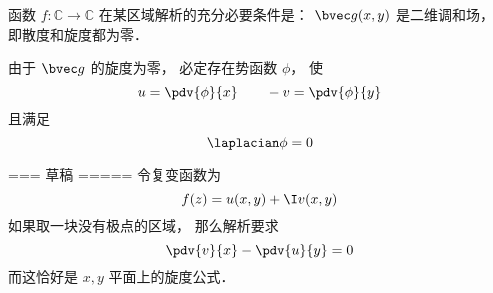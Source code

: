 \begin{theorem}{}
函数 $f:\mathbb C\to\mathbb C$ 在某区域解析的充分必要条件是： $\bvec g(x,y)$ 是二维调和场， 即散度和旋度都为零．
\end{theorem}
由于 $\bvec g$ 的旋度为零， 必定存在势函数 $\phi$， 使
\begin{equation}
u = \pdv{\phi}{x} \qquad -v = \pdv{\phi}{y}
\end{equation}
且满足
\begin{equation}
\laplacian \phi = 0
\end{equation}

=== 草稿 =====
令复变函数为
\begin{equation}
f(z) = u(x,y) + \I v(x,y)
\end{equation}
如果取一块没有极点的区域， 那么解析要求
\begin{equation}
\pdv{v}{x} - \pdv{u}{y} = 0
\end{equation}
而这恰好是 $x,y$ 平面上的旋度公式．

